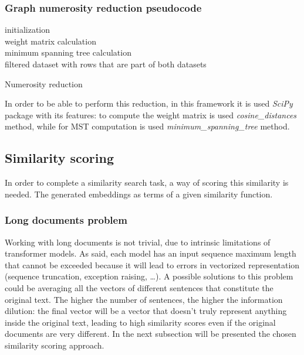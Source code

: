 \documentclass[\main/main.tex]{subfiles}
\begin{document}
\subsubsection{Graph numerosity reduction pseudocode}
\begin{center}
    \begin{algorithm}[H]
     initialization\\
     weight matrix calculation\\
     minimum spanning tree calculation\\
     \Return filtered dataset with rows that are part of both datasets
     \caption{Numerosity reduction}
     \label{alg_numerosity_reduction}
    \end{algorithm}
\end{center}
In order to be able to perform this reduction, in this framework it is used \emph{SciPy} \cite{2020SciPyNMeth} package with its features: to compute the weight matrix is used \emph{cosine\_distances} method, while for MST computation is used \emph{minimum\_spanning\_tree} method.
\subsection{Similarity scoring}
In order to complete a similarity search task, a way of scoring this similarity is needed. The generated embeddings as terms of a given similarity function. 
\subsubsection{Long documents problem}
Working with long documents is not trivial, due to intrinsic limitations of transformer models. As said, each model has an input sequence maximum length that cannot be exceeded because it will lead to errors in vectorized representation (sequence truncation, exception raising, \dots). A possible solutions to this problem could be averaging all the vectors of different sentences that constitute the original text. The higher the number of sentences, the higher the information dilution: the final vector will be a vector that doesn't truly represent anything inside the original text, leading to high similarity scores even if the original documents are very different. In the next subsection will be presented the chosen similarity scoring approach.
\end{document}
